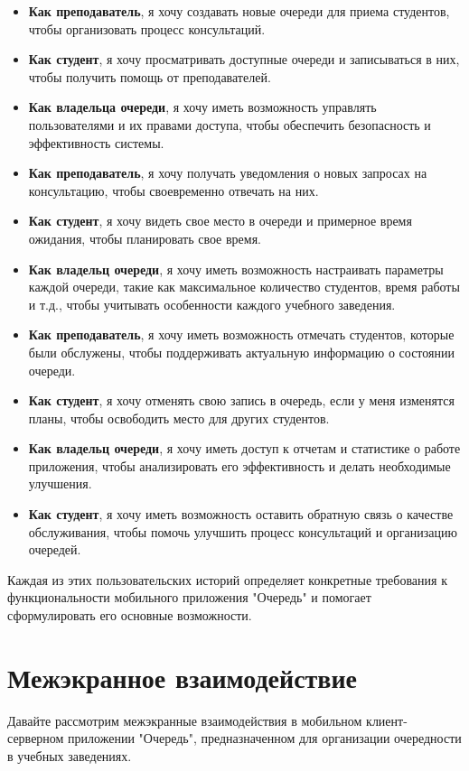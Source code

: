 \begin{itemize}
	\item \textbf{Как преподаватель}, я хочу создавать новые очереди
		для приема студентов, чтобы организовать процесс консультаций.
	\item \textbf{Как студент}, я хочу просматривать доступные очереди
		и записываться в них, чтобы получить помощь от преподавателей.
	\item \textbf{Как владельца очереди}, я хочу иметь возможность управлять
		пользователями и их правами доступа, чтобы обеспечить безопасность
		и эффективность системы.
	\item \textbf{Как преподаватель}, я хочу получать уведомления
		о новых запросах на консультацию, чтобы своевременно отвечать на них.
	\item \textbf{Как студент}, я хочу видеть свое место в очереди
		и примерное время ожидания, чтобы планировать свое время.
	\item \textbf{Как владельц очереди}, я хочу иметь возможность настраивать
		параметры каждой очереди, такие как максимальное количество студентов,
		время работы и т.д.,
		чтобы учитывать особенности каждого учебного заведения.
	\item \textbf{Как преподаватель}, я хочу иметь возможность отмечать
		студентов, которые были обслужены,
		чтобы поддерживать актуальную информацию о состоянии очереди.
	\item \textbf{Как студент}, я хочу отменять свою запись в очередь,
		если у меня изменятся планы,
		чтобы освободить место для других студентов.
	\item \textbf{Как владельц очереди}, я хочу иметь доступ к отчетам
		и статистике о работе приложения,
		чтобы анализировать его эффективность и делать необходимые улучшения.
	\item \textbf{Как студент}, я хочу иметь возможность оставить обратную
		связь о качестве обслуживания,
		чтобы помочь улучшить процесс консультаций и организацию очередей.
\end{itemize}

Каждая из этих пользовательских историй определяет конкретные требования
к функциональности мобильного приложения "Очередь"
и помогает сформулировать его основные возможности.

\section{Межэкранное взаимодействие}

Давайте рассмотрим межэкранные взаимодействия
в мобильном клиент-серверном приложении "Очередь",
предназначенном для организации очередности в учебных заведениях.

